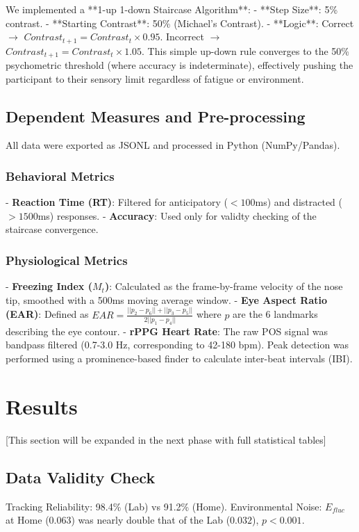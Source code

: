 \documentclass[journal]{IEEEtran}
\begin{document}
We implemented a **1-up 1-down Staircase Algorithm**:
- **Step Size**: 5\% contrast.
- **Starting Contrast**: 50\% (Michael's Contrast).
- **Logic**: Correct $\to$ $Contrast_{t+1} = Contrast_t \times 0.95$. Incorrect $\to$ $Contrast_{t+1} = Contrast_t \times 1.05$.
This simple up-down rule converges to the 50\% psychometric threshold (where accuracy is indeterminate), effectively pushing the participant to their sensory limit regardless of fatigue or environment.

\subsection{Dependent Measures and Pre-processing}
All data were exported as JSONL and processed in Python (NumPy/Pandas).

\subsubsection{Behavioral Metrics}
- \textbf{Reaction Time (RT)}: Filtered for anticipatory ($<100$ms) and distracted ($>1500$ms) responses.
- \textbf{Accuracy}: Used only for validty checking of the staircase convergence.

\subsubsection{Physiological Metrics}
- \textbf{Freezing Index ($M_t$)}: Calculated as the frame-by-frame velocity of the nose tip, smoothed with a 500ms moving average window.
- \textbf{Eye Aspect Ratio (EAR)}: Defined as $EAR = \frac{||p_2 - p_6|| + ||p_3 - p_5||}{2||p_1 - p_4||}$ where $p$ are the 6 landmarks describing the eye contour.
- \textbf{rPPG Heart Rate}: The raw POS signal was bandpass filtered (0.7-3.0 Hz, corresponding to 42-180 bpm). Peak detection was performed using a prominence-based finder to calculate inter-beat intervals (IBI).

\section{Results}
[This section will be expanded in the next phase with full statistical tables]
\subsection{Data Validity Check}
Tracking Reliability: 98.4\% (Lab) vs 91.2\% (Home).
Environmental Noise: $E_{fluc}$ at Home ($0.063$) was nearly double that of the Lab ($0.032$), $p < 0.001$.
\end{document}
